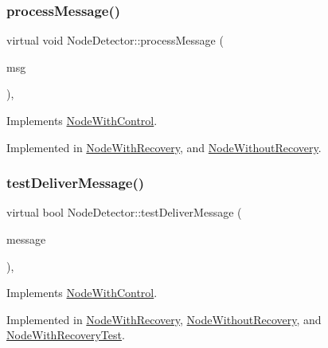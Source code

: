 \subsubsection{\texorpdfstring{process\+Message()}{processMessage()}}
{\footnotesize\ttfamily virtual void Node\+Detector\+::process\+Message (\begin{DoxyParamCaption}\item[{c\+Message $\ast$}]{msg }\end{DoxyParamCaption})\hspace{0.3cm}{\ttfamily [protected]}, {}}



Implements \hyperlink{classNodeWithControl_af532082fab76c38d8c50ca90e991f4c3}{Node\+With\+Control}.



Implemented in \hyperlink{classNodeWithRecovery_a216c29d76ddb0e94cd5701ff208c7f5b}{Node\+With\+Recovery}, and \hyperlink{classNodeWithoutRecovery_a0b44132b4ebc650399711766cb050399}{Node\+Without\+Recovery}.

\mbox{\label{classNodeDetector_a51e7dccd54e94bbe937752ca39dfdba4}} 
\subsubsection{\texorpdfstring{test\+Deliver\+Message()}{testDeliverMessage()}}
{\footnotesize\ttfamily virtual bool Node\+Detector\+::test\+Deliver\+Message (\begin{DoxyParamCaption}\item[{const \hyperlink{structures_8h_a7e7bdc1d2fff8a9436f2f352b2711ed6}{message\+Info} \&}]{message }\end{DoxyParamCaption})\hspace{0.3cm}{\ttfamily [protected]}, {}}



Implements \hyperlink{classNodeWithControl_a84df0beabbaed80e7da017d592480515}{Node\+With\+Control}.



Implemented in \hyperlink{classNodeWithRecovery_aec147b3723b3dab00f9610453ba8daba}{Node\+With\+Recovery}, \hyperlink{classNodeWithoutRecovery_a8cf83ec6d0af26e385dcde0bc03f5b6d}{Node\+Without\+Recovery}, and \hyperlink{classNodeWithRecoveryTest_af9b78d0ed4fefb97e2f54c9279aa4655}{Node\+With\+Recovery\+Test}.



